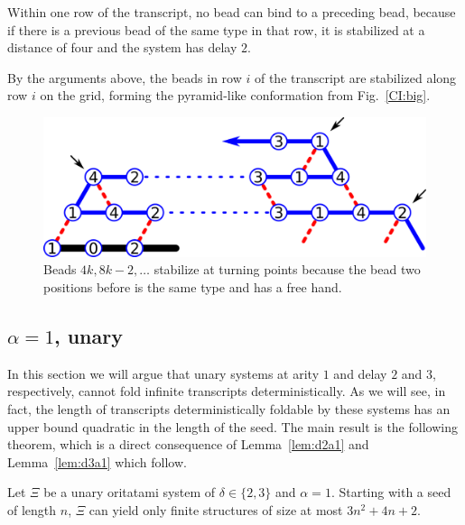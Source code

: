 Within one row of the transcript, no bead can bind to a preceding bead, because if there is a previous bead of the same type in that row, it is stabilized at a distance of four and the system has delay $2$.

By the arguments above, the beads in row $i$ of the transcript are stabilized along row $i$ on the grid, forming the pyramid-like conformation from Fig.~\ref{CI:big}.


\begin{figure}
	\centering
	\includegraphics[width=0.7\linewidth]{./Fig/CI_turnn}
	\caption{Beads $4k, 8k-2, \dots$ stabilize at turning points because the bead two positions before is the same type and has a free hand.}
	\label{CI:turn}
\end{figure}




\subsection{$\alpha = 1$, unary}
\label{sec:unary}

In this section we will argue that unary systems at arity $1$ and delay $2$ and $3$, respectively, cannot fold infinite transcripts deterministically. As we will see, in fact, the length of transcripts deterministically foldable by these systems has an upper bound quadratic in the length of the seed. The main result is the following theorem, which is a direct consequence of Lemma~\ref{lem:d2a1}  and Lemma~\ref{lem:d3a1} which follow.
\begin{theorem}[$\delta\in\{ 2,3\}, \alpha = 1$]\label{thm:d23a1}
	Let $\Xi$ be a unary oritatami system of $\delta \in \{2,3\}$ and $\alpha = 1$. Starting with a seed of length $n$, $\Xi$ can yield only finite structures of size at most $3n^2+4n+2$.
\end{theorem}

